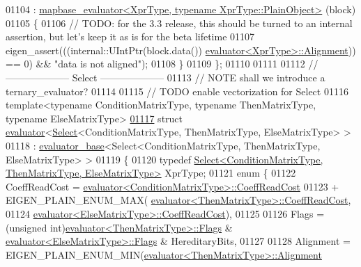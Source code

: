 \begin{DoxyCode}
01104     : \hyperlink{struct_eigen_1_1internal_1_1mapbase__evaluator}{mapbase\_evaluator<XprType, typename XprType::PlainObject>}
      (block) 
01105   \{
01106     \textcolor{comment}{// TODO: for the 3.3 release, this should be turned to an internal assertion, but let's keep it as is
       for the beta lifetime}
01107     eigen\_assert(((internal::UIntPtr(block.data()) %
      \hyperlink{struct_eigen_1_1internal_1_1evaluator}{evaluator<XprType>::Alignment})) == 0) && \textcolor{stringliteral}{"data is not aligned"});
01108   \}
01109 \};
01110 
01111 
01112 \textcolor{comment}{// -------------------- Select --------------------}
01113 \textcolor{comment}{// NOTE shall we introduce a ternary\_evaluator?}
01114 
01115 \textcolor{comment}{// TODO enable vectorization for Select}
01116 \textcolor{keyword}{template}<\textcolor{keyword}{typename} ConditionMatrixType, \textcolor{keyword}{typename} ThenMatrixType, \textcolor{keyword}{typename} ElseMatrixType>
\hyperlink{struct_eigen_1_1internal_1_1evaluator_3_01_select_3_01_condition_matrix_type_00_01_then_matrix_t0c555ecce04e199df0b1ebada3749ccc}{01117} \textcolor{keyword}{struct }\hyperlink{struct_eigen_1_1internal_1_1evaluator}{evaluator}<\hyperlink{group___core___module_class_eigen_1_1_select}{Select}<ConditionMatrixType, ThenMatrixType, ElseMatrixType> >
01118   : \hyperlink{struct_eigen_1_1internal_1_1evaluator__base}{evaluator\_base}<Select<ConditionMatrixType, ThenMatrixType, ElseMatrixType> >
01119 \{
01120   \textcolor{keyword}{typedef} \hyperlink{group___core___module_class_eigen_1_1_select}{Select<ConditionMatrixType, ThenMatrixType, ElseMatrixType>}
       XprType;
01121   \textcolor{keyword}{enum} \{
01122     CoeffReadCost = \hyperlink{struct_eigen_1_1internal_1_1evaluator}{evaluator<ConditionMatrixType>::CoeffReadCost}
01123                   + EIGEN\_PLAIN\_ENUM\_MAX(
      \hyperlink{struct_eigen_1_1internal_1_1evaluator}{evaluator<ThenMatrixType>::CoeffReadCost},
01124                                          
      \hyperlink{struct_eigen_1_1internal_1_1evaluator}{evaluator<ElseMatrixType>::CoeffReadCost}),
01125 
01126     Flags = (\textcolor{keywordtype}{unsigned} int)\hyperlink{struct_eigen_1_1internal_1_1evaluator}{evaluator<ThenMatrixType>::Flags} & 
      \hyperlink{struct_eigen_1_1internal_1_1evaluator}{evaluator<ElseMatrixType>::Flags} & HereditaryBits,
01127     
01128     Alignment = EIGEN\_PLAIN\_ENUM\_MIN(\hyperlink{struct_eigen_1_1internal_1_1evaluator}{evaluator<ThenMatrixType>::Alignment}

\end{DoxyCode}
